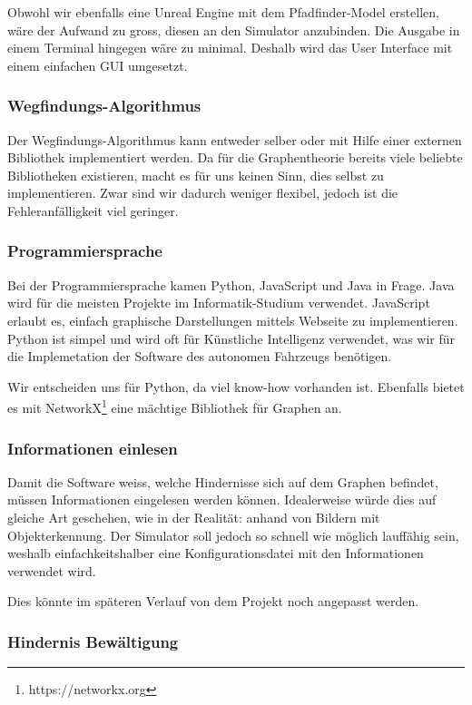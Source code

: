 \documentclass[../main.tex]{subfiles}
\begin{document}
Obwohl wir ebenfalls eine Unreal Engine mit dem Pfadfinder-Model erstellen, wäre der Aufwand zu gross, diesen an den Simulator anzubinden. Die Ausgabe in einem Terminal hingegen wäre zu minimal. Deshalb wird das User Interface mit einem einfachen GUI umgesetzt. 

\subsubsection{Wegfindungs-Algorithmus}

Der Wegfindungs-Algorithmus kann entweder selber oder mit Hilfe einer externen Bibliothek 
implementiert werden. Da für die Graphentheorie bereits viele beliebte Bibliotheken existieren, macht es für uns keinen Sinn, dies selbst zu implementieren. Zwar sind wir dadurch weniger flexibel, jedoch ist die Fehleranfälligkeit viel geringer.  

\subsubsection{Programmiersprache}

Bei der Programmiersprache kamen Python, JavaScript und Java in Frage.
Java wird für die meisten Projekte im Informatik-Studium verwendet. JavaScript erlaubt es, einfach graphische Darstellungen mittels Webseite zu implementieren. Python ist simpel und wird oft für Künstliche Intelligenz verwendet, was wir für die Implemetation der Software des autonomen Fahrzeugs benötigen. 

Wir entscheiden uns für Python, da viel know-how vorhanden ist. Ebenfalls bietet es mit NetworkX\footnote{https://networkx.org} eine mächtige Bibliothek für Graphen an.

\subsubsection{Informationen einlesen}

Damit die Software weiss, welche Hindernisse sich auf dem Graphen befindet, müssen Informationen eingelesen werden können. Idealerweise würde dies auf gleiche Art geschehen, wie in der Realität: anhand von Bildern mit Objekterkennung. Der Simulator soll jedoch so schnell wie möglich lauffähig sein, weshalb einfachkeitshalber eine Konfigurationsdatei mit den Informationen verwendet wird.

Dies könnte im späteren Verlauf von dem Projekt noch angepasst werden.

\subsubsection{Hindernis Bewältigung}
\end{document}
